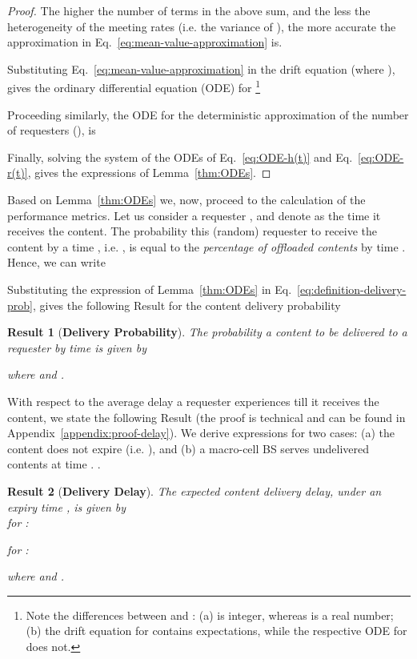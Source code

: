 \documentclass[10pt,conference,letterpaper]{IEEEtran}
\newtheorem{result}{Result}
\newcommand{\eq}[1]{Eq.~\eqref{#1}}
\begin{document}
\begin{proof}
The higher the number of terms in the above sum, and the less the heterogeneity of the meeting rates (i.e. the variance of ), the more accurate the approximation in \eq{eq:mean-value-approximation} is.

Substituting \eq{eq:mean-value-approximation} in the drift equation (where ), gives the ordinary differential equation (ODE) for \footnote{Note the differences between  and : (a)  is integer, whereas  is a real number; (b) the drift equation for  contains expectations, while the respective ODE for  does not.}


Proceeding similarly, the ODE for the deterministic approximation of the number of requesters (), is 


Finally, solving the system of the ODEs of \eq{eq:ODE-h(t)} and \eq{eq:ODE-r(t)}, gives the expressions of Lemma~\ref{thm:ODEs}.
\end{proof}

Based on Lemma~\ref{thm:ODEs} we, now, proceed to the calculation of the performance metrics. Let us consider a requester , and denote as  the time it receives the content. The probability this (random) requester to receive the content by a time , i.e. , is equal to the \textit{percentage of offloaded contents} by time . Hence, we can write

Substituting the expression of Lemma~\ref{thm:ODEs} in \eq{eq:definition-delivery-prob}, gives the following Result for the content delivery probability


\begin{result}[\textbf{Delivery Probability}]\label{result:delivery-probability-single}
The probability a content to be delivered to a requester by time  is given by

where  and .
\end{result}


With respect to the average delay a requester experiences till it receives the content, we state the following Result (the proof is technical and can be found in Appendix~\ref{appendix:proof-delay}). We derive expressions for two cases: (a) the content does not expire (i.e. ), and (b) a macro-cell BS serves undelivered contents at time . .
\begin{result}[\textbf{Delivery Delay}]\label{result:expected-delay-single}
The expected content delivery delay, under an expiry time , is given by\\
 for :

 for :

where  and .

\end{result}
\end{document}
